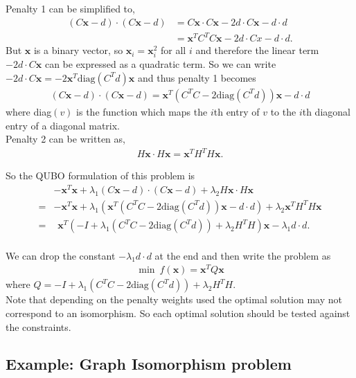 \documentclass{article}
\begin{document}
\noindent Penalty 1 can be simplified to,
\begin{align*}
    (C\mathbf{x} - d)\cdot (C\mathbf{x} - d) &= C\mathbf{x} \cdot C\mathbf{x} - 2d\cdot C\mathbf{x} - d\cdot d \\
    &= \mathbf{x}^T C^T C \mathbf{x} - 2d\cdot Cx - d\cdot d.
\end{align*}
But \(\mathbf{x}\) is a binary vector, so \(\mathbf{x}_i = \mathbf{x}_i^2\) for all \(i\) and therefore the linear term \(-2d\cdot C\mathbf{x}\) can be expressed as a quadratic term. So we can write \(-2d\cdot C \mathbf{x} = -2\mathbf{x}^T\text{diag}(C^Td)\mathbf{x}\) and thus penalty 1 becomes
\begin{align*}
    (C\mathbf{x} - d)\cdot (C\mathbf{x} - d) = \mathbf{x}^T( C^T C -2\text{diag}(C^T d))\mathbf{x} - d\cdot d
\end{align*}
where diag\((v)\) is the function which maps the \(i\)th entry of \(v\) to the \(i\)th diagonal entry of a diagonal matrix.\\

\noindent Penalty 2 can be written as,
\begin{align*}
    H\mathbf{x} \cdot H\mathbf{x} = \mathbf{x}^T H^T H \mathbf{x}.
\end{align*}

\noindent So the QUBO formulation of this problem is 
\begin{align*}
    &-\mathbf{x}^T \mathbf{x} + \lambda_1(C\mathbf{x} - d)\cdot (C\mathbf{x} - d)  +\lambda_2 H\mathbf{x} \cdot H\mathbf{x}\\
    = &-\mathbf{x}^T \mathbf{x} + \lambda_1(\mathbf{x}^T( C^T C -2\text{diag}(C^T d))\mathbf{x} - d\cdot d) + \lambda_2 \mathbf{x}^T H^T H \mathbf{x}\\
    = &\hspace{5pt} \mathbf{x}^T (-I + \lambda_1( C^T C -2\text{diag}(C^T d)) + 
    \lambda_2 H^T H) \mathbf{x} - \lambda_1 d \cdot d.
\end{align*}\\
We can drop the constant \(- \lambda_1 d \cdot d\) at the end and then write the problem as
\begin{align*}
    \min \: f(\mathbf{x}) = \mathbf{x}^T Q \mathbf{x}
\end{align*}
where \(Q = -I + \lambda_1( C^T C -2\text{diag}(C^T d)) + \lambda_2 H^T H\).\\

\noindent Note that depending on the penalty weights used the optimal solution may not correspond to an isomorphism. So each optimal solution should be tested against the constraints.

\subsection{Example: Graph Isomorphism problem}






\nocite{*}
\printbibliography %
\end{document}
